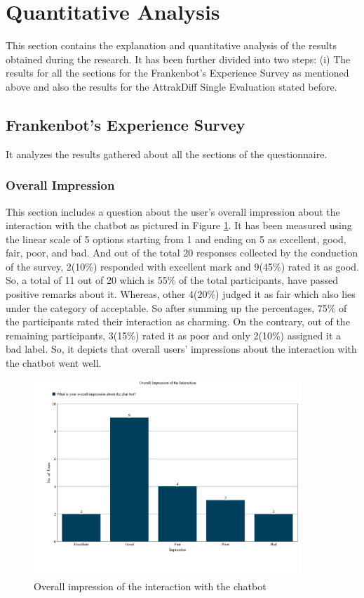 \section{Quantitative Analysis}
This section contains the explanation and quantitative analysis of the results obtained during the research. It has been further divided into two steps: (i) The results for all the sections for the Frankenbot's Experience Survey as mentioned above and also the results for the AttrakDiff Single Evaluation stated before. 

\subsection{Frankenbot's Experience Survey}
It analyzes the results gathered about all the sections of the questionnaire.

\subsubsection*{Overall Impression}
This section includes a question about the user's overall impression about the interaction with the chatbot as pictured in Figure \ref{fig:overallImpre}. It has been measured using the linear scale of 5 options starting from 1 and ending on 5 as excellent, good, fair, poor, and bad. And out of the total 20 responses collected by the conduction of the survey, 2(10\%) responded with excellent mark and 9(45\%) rated it as good. So, a total of 11 out of 20 which is 55\% of the total participants, have passed positive remarks about it. Whereas, other 4(20\%) judged it as fair which also lies under the category of acceptable. So after summing up the percentages, 75\% of the participants rated their interaction as charming. On the contrary, out of the remaining participants, 3(15\%) rated it as poor and only 2(10\%) assigned it a bad label. So, it depicts that overall users' impressions about the interaction with the chatbot went well.

\begin{figure}[!h]
    \centering
    \includegraphics[width=0.9\textwidth]{img/Overall_Impression_Updated.PNG}
    \caption{Overall impression of the interaction with the chatbot}
    \label{fig:overallImpre}
\end{figure}

